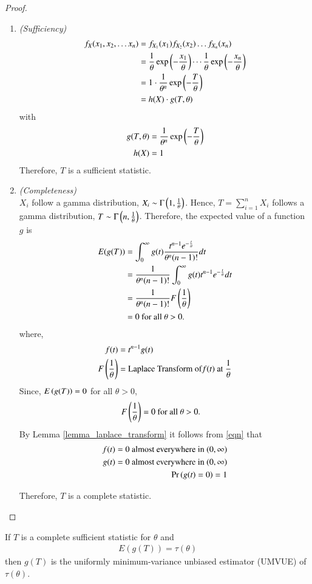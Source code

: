 \documentclass[journal,12pt,twocolumn]{IEEEtran}
\begin{document}
\begin{proof}
\begin{enumerate}
\item \textit{(Sufficiency)}
\begin{align}
f_{X}(x_1, x_2, \ldots x_n) &= f_{X_1}(x_1)f_{X_2}(x_2) \ldots f_{X_n}(x_n)\\
&= \dfrac{1}{\theta} \exp\left(-\dfrac{x_1}{\theta}\right) \cdots \dfrac{1}{\theta} \exp\left(-\dfrac{x_n}{\theta}\right)\\
&= 1 \cdot \dfrac{1}{\theta^n} \exp\left(-\dfrac{T}{\theta}\right)\\
&= h(X) \cdot g(T, \theta) 
\end{align}
with 
\begin{align}
g(T, \theta) &= \dfrac{1}{\theta^n} \exp\left(-\dfrac{T}{\theta}\right)\\
h(X) &= 1
\end{align}
Therefore, $T$ is a sufficient statistic.\\
\item \textit{(Completeness)}\\
$X_i$ follow a gamma distribution, $X_i \sim \Gamma \left(1, \frac{1}{\theta}\right)$. Hence, $T = \sum_{i=1}^n X_i $ follows a gamma distribution, $T \sim \Gamma \left(n, \frac{1}{\theta}\right)$. Therefore, the expected value of a function $g$ is
\begin{align}
E(g(T)) &= 
\int_0 ^{\infty} g(t) \dfrac{t^{n-1} e^{-\frac{t}{\theta}}}{\theta^n(n-1)!} dt\\ 
&= \frac{1}{\theta^n (n-1)!} \int_0 ^{\infty} g(t) t^{n-1} e^{-\frac{t}{\theta}} dt\\ 
&= \frac{1}{\theta^n (n-1)!} F \left(\frac{1}{\theta}\right)\\
&= 0 \text{ for all } \theta > 0.
\end{align}
where, 
\begin{align}
f(t) &= t^{n-1}g(t)\\
F \left(\frac{1}{\theta}\right) &= \text{Laplace Transform of} f(t) \text{ at } \frac{1}{\theta}
\end{align}
Since, $E\left(g(T)\right)=0$ for all $\theta > 0$, 
\begin{align}
\label{eqn}
F \left(\frac{1}{\theta}\right) &= 0 \text{ for all } \theta > 0.
\end{align}
By Lemma \ref{lemma_laplace_transform} it follows from \eqref{eqn} that
\begin{align}
f(t)=0 \text{ almost everywhere in } (0, \infty)\\
g(t)=0 \text{ almost everywhere in } (0, \infty)\\
\Pr\left(g(t)=0\right) = 1
\end{align}

Therefore, $T$ is a complete statistic.
\end{enumerate}
\end{proof}
\begin{theorem}
If $T$ is a complete sufficient statistic for $\theta$ and 
\begin{align}
\label{eqn 2.0.1}
E(g(T)) = \tau(\theta)
\end{align}
then $g(T)$ is the uniformly minimum-variance unbiased estimator (UMVUE) of $\tau(\theta)$.
\end{theorem}
\end{document}
